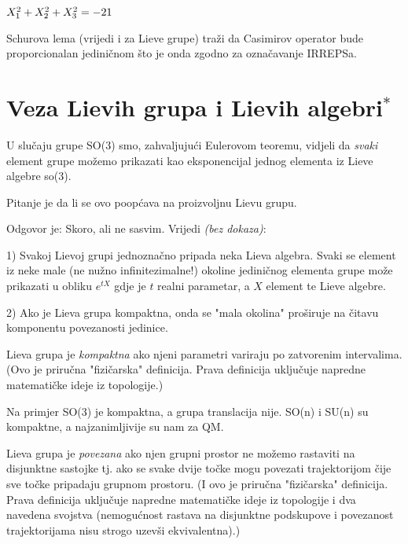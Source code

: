 \begin{primjer}
$X_{1}^2 + X_{2}^2 + X_{3}^2 = -2 1 $

Schurova lema (vrijedi i za Lieve grupe) traži da Casimirov operator 
bude proporcionalan jediničnom što je onda zgodno za označavanje IRREPSa.
\end{primjer}

\section{Veza Lievih grupa i Lievih algebri$^*$}

U slučaju grupe SO(3) smo, zahvaljujući Eulerovom teoremu, vidjeli da
\emph{svaki} element grupe možemo prikazati kao eksponencijal jednog
elementa iz Lieve algebre so(3).

Pitanje je da li se ovo poopćava na proizvoljnu Lievu grupu.

Odgovor je: Skoro, ali ne sasvim. Vrijedi \emph{(bez dokaza)}:

1) Svakoj Lievoj grupi jednoznačno pripada neka Lieva algebra. Svaki 
  se element iz neke male (ne nužno infinitezimalne!) okoline 
  jediničnog elementa grupe može
  prikazati u obliku $e^{t X}$ gdje je $t$ realni parametar, a $X$ element
  te Lieve algebre.

2) Ako je Lieva grupa kompaktna, onda se "mala okolina" proširuje na
   čitavu komponentu povezanosti jedinice.

\begin{definicija}[Kompaktnost]
Lieva grupa je \emph{kompaktna} ako njeni parametri variraju po zatvorenim intervalima.
(Ovo je priručna "fizičarska" definicija. Prava definicija uključuje napredne
matematičke ideje iz topologije.)
\label{def:kompaktnost}
\end{definicija}

Na primjer SO(3) je kompaktna, a grupa translacija nije. SO(n) i SU(n) su
 kompaktne, a najzanimljivije su nam za QM.

\begin{definicija}[Povezanost]
Lieva grupa je \emph{povezana} ako njen grupni prostor ne možemo
rastaviti na disjunktne sastojke tj. ako se svake dvije točke 
mogu povezati trajektorijom čije sve točke pripadaju grupnom prostoru.
(I ovo je priručna "fizičarska" definicija. Prava definicija uključuje napredne
matematičke ideje iz topologije i dva navedena svojstva (nemogućnost rastava
na disjunktne podskupove i povezanost trajektorijama nisu strogo uzevši
ekvivalentna).)
\label{def:povezanost}
\end{definicija}


